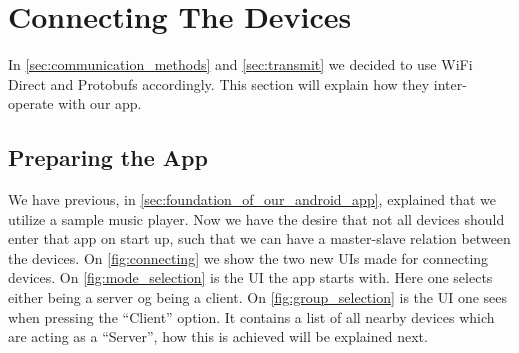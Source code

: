 \section{Connecting The Devices}
In \cref{sec:communication_methods} and \cref{sec:transmit} we decided to use WiFi Direct and Protobufs accordingly.
This section will explain how they inter-operate with our app.

\subsection{Preparing the App}
We have previous, in \cref{sec:foundation_of_our_android_app}, explained that we utilize a sample music player.
Now we have the desire that not all devices should enter that app on start up, such that we can have a master-slave relation between the devices.
On \cref{fig:connecting} we show the two new UIs made for connecting devices.
On \cref{fig:mode_selection} is the UI the app starts with.
Here one selects either being a server og being a client.
On \cref{fig:group_selection} is the UI one sees when pressing the ``Client'' option.
It contains a list of all nearby devices which are acting as a ``Server'', how this is achieved will be explained next.

